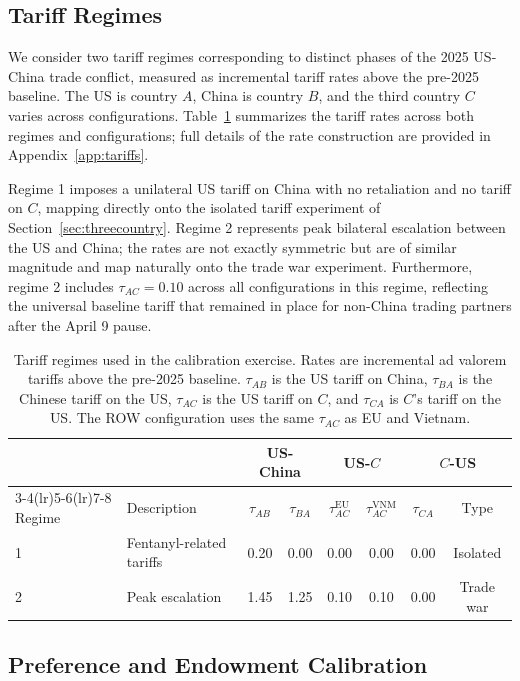 \documentclass[11pt]{article}
\theoremstyle{plain}
\theoremstyle{remark}
\numberwithin{lemma}{section}
\numberwithin{proposition}{section}
\numberwithin{corollary}{section}
\begin{document}
\subsection{Tariff Regimes}
We consider two tariff regimes corresponding to distinct phases of the 2025 US-China trade conflict, measured as incremental tariff rates above the pre-2025 baseline. The US is country $A$, China is country $B$, and the third country $C$ varies across configurations. Table~\ref{tab:tariff_regimes} summarizes the tariff rates across both regimes and configurations; full details of the rate construction are provided in Appendix~\ref{app:tariffs}.

Regime 1 imposes a unilateral US tariff on China with no retaliation and no tariff on $C$, mapping directly onto the isolated tariff experiment of Section~\ref{sec:threecountry}. Regime 2 represents peak bilateral escalation between the US and China; the rates are not exactly symmetric but are of similar magnitude and map naturally onto the trade war experiment. Furthermore, regime 2 includes $\tau_{AC} = 0.10$ across all configurations in this regime, reflecting the universal baseline tariff that remained in place for non-China trading partners after the April 9 pause.

\begin{table}[htbp]
\centering
\begin{tabular}{llcccccc}
\hline
& & \multicolumn{2}{c}{US-China} & \multicolumn{2}{c}{US-$C$} & \multicolumn{2}{c}{$C$-US} \\
\cmidrule(lr){3-4}\cmidrule(lr){5-6}\cmidrule(lr){7-8}
Regime & Description & $\tau_{AB}$ & $\tau_{BA}$ & $\tau_{AC}^{\mathrm{EU}}$ & $\tau_{AC}^{\mathrm{VNM}}$ & $\tau_{CA}$ & Type \\
\hline
1 & Fentanyl-related tariffs        & 0.20 & 0.00 & 0.00 & 0.00 & 0.00 & Isolated \\
2 & Peak escalation                 & 1.45 & 1.25 & 0.10 & 0.10 & 0.00 & Trade war \\
\hline
\end{tabular}
\caption{Tariff regimes used in the calibration exercise. Rates are incremental ad valorem tariffs above the pre-2025 baseline. $\tau_{AB}$ is the US tariff on China, $\tau_{BA}$ is the Chinese tariff on the US, $\tau_{AC}$ is the US tariff on $C$, and $\tau_{CA}$ is $C$'s tariff on the US. The ROW configuration uses the same $\tau_{AC}$ as EU and Vietnam.}
\label{tab:tariff_regimes}
\end{table}

\subsection{Preference and Endowment Calibration}
\end{document}
